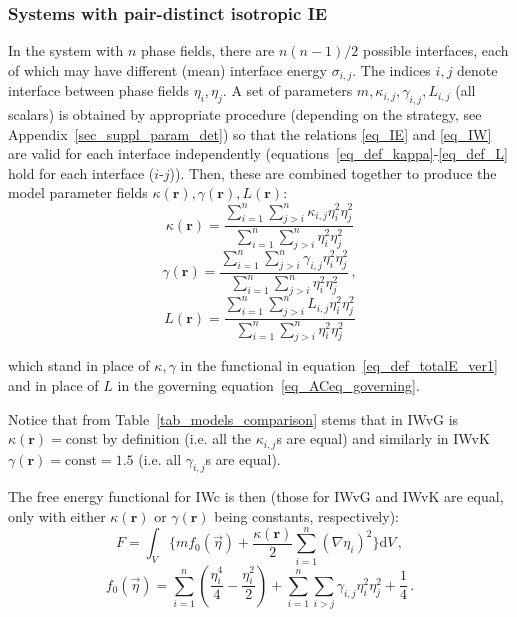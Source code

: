 		\subsubsection{Systems with pair-distinct isotropic IE}
		In the system with $n$ phase fields, there are $n(n-1)/2$ possible interfaces, each of which may have different (mean) interface energy $\sigma_{i,j}$. The indices $i,j$ denote interface between phase fields $\eta_i,\eta_j$. A set of parameters $m,\kappa_{i,j},\gamma_{i,j}, L_{i,j}$ (all scalars) is obtained by appropriate procedure  (depending on the strategy, see Appendix~\ref{sec_suppl_param_det}) so that the relations \eqref{eq_IE} and \eqref{eq_IW} are valid for each interface independently (equations~\eqref{eq_def_kappa}-\eqref{eq_def_L} hold for each interface ($i$-$j$)). Then, these are combined together to produce the model parameter fields $\kappa(\bm{r}),\gamma(\bm{r}),L(\bm{r})$:
		\begin{equation}
			\kappa(\bm{r}) = \frac{\sum_{i=1}^n\sum_{j>i}^n\kappa_{i,j}\eta_i^2\eta_j^2}{\sum_{i=1}^n\sum_{j>i}^n\eta_i^2\eta_j^2}
		\end{equation}
		\begin{equation}
			\gamma(\bm{r}) = \frac{\sum_{i=1}^n\sum_{j>i}^n\gamma_{i,j}\eta_i^2\eta_j^2}{\sum_{i=1}^n\sum_{j>i}^n\eta_i^2\eta_j^2} \,,
		\end{equation}
		\begin{equation}
			L(\bm{r})= \frac{\sum_{i=1}^n\sum_{j>i}^nL_{i,j}\eta_i^2\eta_j^2}{\sum_{i=1}^n\sum_{j>i}^n\eta_i^2\eta_j^2}
		\end{equation}
		
		which stand in place of $\kappa,\gamma$ in the functional in equation~\eqref{eq_def_totalE_ver1} and in place of $L$ in the governing equation~\eqref{eq_ACeq_governing}.
		
		Notice that from Table~\ref{tab_models_comparison} stems  that in IWvG is $\kappa(\bm{r})=\mathrm{const}$ by definition (i.e. all the $\kappa_{i,j}$s are equal) and similarly in IWvK $\gamma(\bm{r})=\mathrm{const}=1.5$ (i.e. all $\gamma_{i,j}$s are equal). 
		
		The free energy functional for IWc is then (those for IWvG and IWvK are equal, only with either $\kappa(\bm{r})$ or $\gamma(\bm{r})$ being constants, respectively):
		\begin{equation} \label{eq_def_totalE_ver2}
			F = \int_V \Bigg\{ m f_0(\vec{\eta}) + \frac{\kappa(\bm{r})}{2}\sum_{i=1}^n(\nabla \eta_i)^2 \Bigg\} \mathrm{d}V \,,
		\end{equation}
		\begin{equation}
			f_0(\vec{\eta}) = \sum_{i=1}^n\left(\frac{\eta_i^4}{4} - \frac{\eta_i^2}{2} \right) +\sum_{i=1}^n\sum_{i>j}\gamma_{i,j}\eta_i^2\eta_j^2 + \frac{1}{4} \,.
		\end{equation}
		
